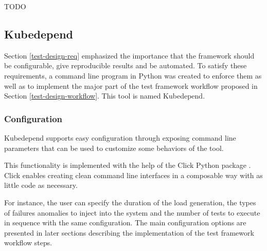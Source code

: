 TODO

\subsection{Kubedepend}


Section \ref{test-design-req} emphasized the importance that the framework should be configurable, give reproducible results and be automated. To satisfy these requirements, a command line program in Python was created to enforce them as well as to implement the major part of the test framework workflow proposed in Section \ref{test-design-workflow}. This tool is named Kubedepend.

\subsubsection{Configuration}

Kubedepend supports easy configuration through exposing command line parameters that can be used to customize some behaviors of the tool.

This functionality is implemented with the help of the Click Python package \cite{Click}. Click enables creating clean command line interfaces in a composable way with as little code as necessary.

For instance, the user can specify the duration of the load generation, the types of failures anomalies to inject into the system and the number of tests to execute in sequence with the same configuration. The main configuration options are presented in later sections describing the implementation of the test framework workflow steps.

